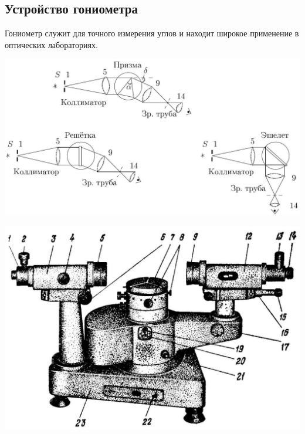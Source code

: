 \subsection*{Устройство гониометра}

Гониометр служит для точного измерения углов и находит широкое применение в оптических лабораториях.

\begin{center}
    \includegraphics[scale=0.2]{2023_04_02_a48ae02e429ba186bcd7g-2}
\end{center}

\begin{center}
\includegraphics[scale=0.2]{2023_04_02_a48ae02e429ba186bcd7g-2(2)}
\end{center}

